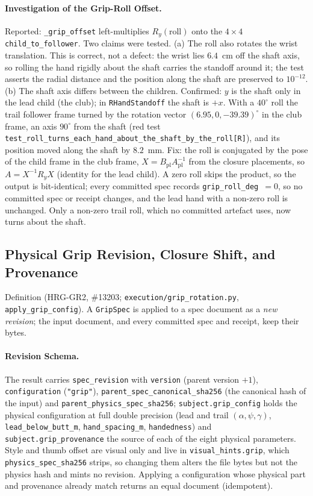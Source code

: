 \documentclass[11pt,a4paper]{article}
\begin{document}
\paragraph{Investigation of the Grip-Roll Offset.}
Reported: \texttt{\_grip\_offset} left-multiplies $R_y(\text{roll})$ onto the
$4\times4$ \texttt{child\_to\_follower}. Two claims were tested. (a) The roll
also rotates the wrist translation. This is correct, not a defect: the wrist
lies $6.4$~cm off the shaft axis, so rolling the hand rigidly about the shaft
carries the standoff around it; the test asserts the radial distance and the
position along the shaft are preserved to $10^{-12}$. (b) The shaft axis
differs between the children. Confirmed: $y$ is the shaft only in the lead
child (the club); in \texttt{RHandStandoff} the shaft is $+x$. With a $40^\circ$
roll the trail follower frame turned by the rotation vector
$(6.95,0,-39.39)^\circ$ in the club frame, an axis $90^\circ$ from the shaft
(red test \texttt{test\_roll\_turns\_each\_hand\_about\_the\_shaft\_by\_the\_roll[R]}),
and its position moved along the shaft by $8.2$~mm. Fix: the roll is
conjugated by the pose of the child frame in the club frame,
$X=B_{\mathrm{pl}}A_{\mathrm{pl}}^{-1}$ from the closure placements, so
$A=X^{-1}R_y X$ (identity for the lead child). A zero roll skips the product,
so the output is bit-identical; every committed spec records
\texttt{grip\_roll\_deg}~$=0$, so no committed spec or receipt changes, and
the lead hand with a non-zero roll is unchanged. Only a non-zero trail roll,
which no committed artefact uses, now turns about the shaft.

\subsection{Physical Grip Revision, Closure Shift, and Provenance}
Definition (HRG-GR2, \#13203; \texttt{execution/grip\_rotation.py},
\texttt{apply\_grip\_config}). A \texttt{GripSpec} is applied to a spec
document as a \emph{new revision}; the input document, and every committed
spec and receipt, keep their bytes.

\paragraph{Revision Schema.}
The result carries \texttt{spec\_revision} with \texttt{version} (parent
version $+1$), \texttt{configuration} (\texttt{"grip"}),
\texttt{parent\_spec\_canonical\_sha256} (the canonical hash of the input) and
\texttt{parent\_physics\_spec\_sha256}; \texttt{subject.grip\_config} holds the
physical configuration at full double precision (lead and trail
$(\alpha,\psi,\gamma)$, \texttt{lead\_below\_butt\_m}, \texttt{hand\_spacing\_m},
\texttt{handedness}) and \texttt{subject.grip\_provenance} the source of each of
the eight physical parameters. Style and thumb offset are visual only and live
in \texttt{visual\_hints.grip}, which \texttt{physics\_spec\_sha256} strips, so
changing them alters the file bytes but not the physics hash and mints no
revision. Applying a configuration whose physical part and provenance already
match returns an equal document (idempotent).
\end{document}
